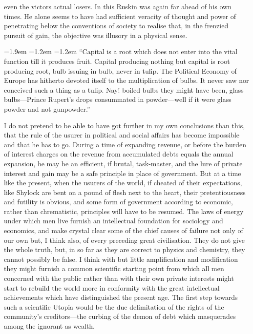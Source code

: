 \documentclass[10.5pt,twoside]{book}
\newenvironment{extract}
  {\par\addvspace{7pt}\begingroup\small\linespread{1.02}\selectfont
   \leftskip=1.9em \rightskip=1.2em \parindent=1.2em \noindent\ignorespaces}
  {\par\endgroup\addvspace{7pt}}
\newcommand{\origpage}[1]{\clearpage\setcounter{page}{#1}}
\begin{document}
\origpage{32}

\noindent even the victors actual losers. In this Ruskin was again far ahead
of his own times. He alone seems to have had sufficient veracity of thought
and power of penetrating below the conventions of society to realise that, in
the frenzied pursuit of gain, the objective was illusory in a physical sense.

\begin{extract}
``Capital is a root which does not enter into the vital function till it
produces fruit. Capital producing nothing but capital is root producing root,
bulb issuing in bulb, never in tulip. The Political Economy of Europe has
hitherto devoted itself to the multiplication of bulbs. It never saw nor
conceived such a thing as a tulip. Nay! boiled bulbs they might have been,
glass bulbs---Prince Rupert's drops consummated in powder---well if it were
glass powder and not gunpowder.''
\end{extract}

I do not pretend to be able to have got further in my own conclusions than
this, that the rule of the usurer in political and social affairs has become
impossible and that he has to go. During a time of expanding revenue, or
before the burden of interest charges on the revenue from accumulated debts
equals the annual expansion, he may be an efficient, if brutal, task-master,
and the lure of private interest and gain may be a safe principle in place of
government. But at a time like the present, when the usurers of the world, if
cheated of their expectations, like Shylock are bent on a pound of flesh next
to the heart, their pretentiousness and futility is obvious, and some form of
government according to economic, rather than chrematistic, principles will
have to be resumed. The laws of energy under which men live furnish an
intellectual foundation for sociology and economics, and make crystal clear
some of the chief causes of failure not only of our own but, I think also, of
every preceding great civilisation. They do not give the whole truth, but, in
so far as they are correct to physics and chemistry, they cannot possibly be
false. I think with but little amplification and modification they might
furnish a common scientific starting point from which all men concerned with
the public rather than with their own private interests might start to rebuild
the world more in conformity with the great intellectual achievements which
have distinguished the present age. The first step towards such a scientific
Utopia would be the due delimitation of the rights of the community's
creditors---the curbing of the demon of debt which masquerades among the
ignorant as wealth.
\end{document}

